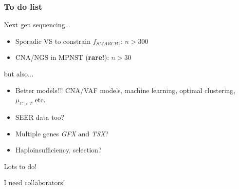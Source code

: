 \documentclass{beamer}
\begin{document}
\begin{frame}
    \frametitle{To do list}

    Next gen sequencing...
    \begin{itemize}
        \item Sporadic VS to constrain $f_{SMARCB1}$: $n > 300$
        \item CNA/NGS in MPNST (\textbf{rare!}): $n > 30$
    \end{itemize}

    but also...
    \begin{itemize}
        \item Better models!!! CNA/VAF models, machine learning, optimal clustering, $\mu_{C>T}$ etc.
        \item SEER data too?
        \item Multiple genes \emph{GFX} and \emph{TSX}? 
        \item Haploinsufficiency, selection?
    \end{itemize}

    \begin{center}
        Lots to do!

        \;

        I need collaborators!
    \end{center}
\end{frame}

%
%

%

\end{document}
